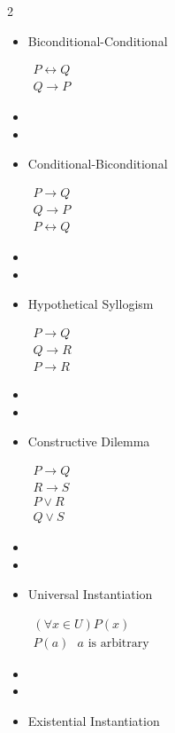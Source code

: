 \documentclass{article}
\begin{document}
\begin{multicols}{2}
\begin{itemize}
			\item Biconditional-Conditional

			$\begin{array}{l}
				 P\leftrightarrow Q\\\hline
				 Q\rightarrow P
			\end{array}$
			\item[]
			\item[]

			\item Conditional-Biconditional

			$\begin{array}{l}
				 P\rightarrow Q\\
				 Q\rightarrow P\\\hline
				 P\leftrightarrow Q
			\end{array}$
			\item[]
			\item[]

			\item Hypothetical Syllogism

			$\begin{array}{l}
				 P\rightarrow Q\\
				 Q\rightarrow R\\\hline
				 P\rightarrow R
			\end{array}$
			\item[]
			\item[]

			\item Constructive Dilemma

			$\begin{array}{l}
				 P\rightarrow Q\\
				 R\rightarrow S\\
				 P\vee R\\\hline
				 Q\vee S
			\end{array}$
			\item[]
			\item[]
			\item Universal Instantiation

			$\begin{array}{l}
				 (\forall x\in U)P(x)\\\hline
					P(a)\mbox{  $a$ is arbitrary}
			\end{array}$
			\item[]
			\item[]

			\item Existential Instantiation


\end{itemize}
\end{multicols}
\end{document}
